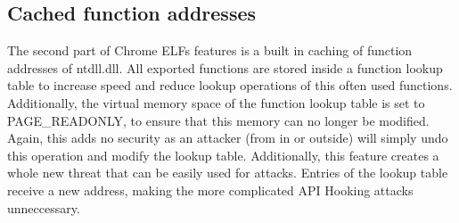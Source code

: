 \subsection{Cached function addresses}
The second part of Chrome ELFs features is a built in caching of function addresses of ntdll.dll. All exported functions are stored inside a function lookup table to increase speed and reduce lookup operations of this often used functions. Additionally, the virtual memory space of the function lookup table is set to PAGE\_READONLY, to ensure that this memory can no longer be modified. Again, this adds no security as an attacker (from in or outside) will simply undo this operation and modify the lookup table. Additionally, this feature creates a whole new threat that can be easily used for attacks. Entries of the lookup table receive a new address, making the more complicated API Hooking attacks unneccessary.